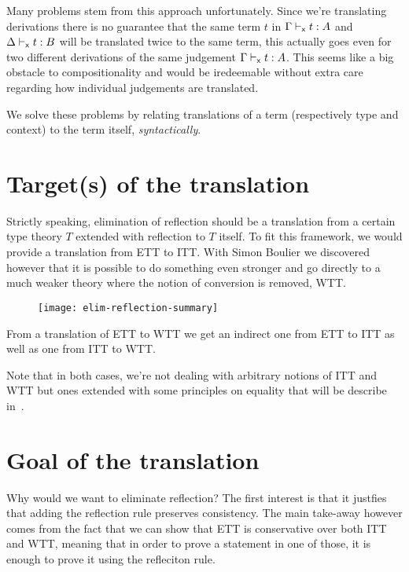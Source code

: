 Many problems stem from this approach unfortunately. Since we're translating
derivations there is no guarantee that the same term \(t\) in
\(\Gamma \vdash_{\mathsf{x}} t : A\) and \(\Delta \vdash_{\mathsf{x}} t : B\) will be translated
twice to the same term, this actually goes even for two different derivations
of the same judgement \(\Gamma \vdash_{\mathsf{x}} t : A\).
This seems like a big obstacle to compositionality and would be iredeemable
without extra care regarding how individual judgements are translated.

We solve these problems by relating translations of a term (respectively
type and context) to the term itself, \emph{syntactically}.

\section{Target(s) of the translation}

Strictly speaking, elimination of reflection should be a translation from a
certain type theory \(T\) extended with reflection to \(T\) itself.
To fit this framework, we would provide a translation from \acrshort{ETT}
to \acrshort{ITT}. With Simon Boulier we discovered however that it is possible
to do something even stronger and go directly to a much weaker theory where
the notion of conversion is removed, \acrshort{WTT}.

\begin{figure}[hb]
  \texttt{[image: elim-reflection-summary]}
\end{figure}

From a translation of \acrshort{ETT} to \acrshort{WTT} we get an indirect one
from \acrshort{ETT} to \acrshort{ITT} as well as one from \acrshort{ITT} to
\acrshort{WTT}.

Note that in both cases, we're not dealing with arbitrary notions of
\acrshort{ITT} and \acrshort{WTT} but ones extended with some principles on
equality that will be describe in~\misref.

\section{Goal of the translation}

Why would we want to eliminate reflection? The first interest is that it
justfies that adding the reflection rule preserves consistency.
The main take-away however comes from the fact that we can show that
\acrshort{ETT} is conservative over both \acrshort{ITT} and \acrshort{WTT},
meaning that in order to prove a statement in one of those, it is enough
to prove it using the refleciton rule.
%
%

